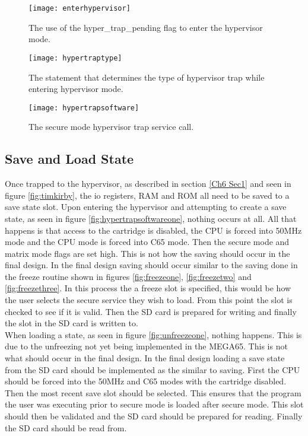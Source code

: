 \begin{figure}
  \centering
  \texttt{[image: enterhypervisor]}
  \caption{The use of the hyper\_trap\_pending flag to enter the hypervisor mode.}
  \label{fig:enterhypervisor}
\end{figure}

\begin{figure}
  \centering
  \texttt{[image: hypertraptype]}
  \caption{The statement that determines the type of hypervisor trap while entering hypervisor mode.}
  \label{fig:hypertraptype}
\end{figure}

\begin{figure}
  \centering
  \texttt{[image: hypertrapsoftware]}
  \caption{The secure mode hypervisor trap service call.}
  \label{fig:hypertrapsoftware}
\end{figure}


\subsection{Save and Load State}

\label{Ch6 Sec3 Sub2}

Once trapped to the hypervisor, as described in section \ref{Ch6 Sec1} and seen in figure \ref{fig:timkirby}, the io registers, RAM and ROM all need to be saved to a save state slot.
Upon entering the hypervisor and attempting to create a save state, as seen in figure \ref{fig:hypertrapsoftwareone}, nothing occurs at all. All that happens is that access to the cartridge is disabled, the CPU is forced into 50MHz mode and the CPU mode is forced into C65 mode. Then the secure mode and matrix mode flags are set high. This is not how the saving should occur in the final design. In the final design saving should occur similar to the saving done in the freeze routine shown in figures \ref{fig:freezeone}, \ref{fig:freezetwo} and \ref{fig:freezethree}. In this process the a freeze slot is specified, this would be how the user selects the secure service they wish to load. From this point the slot is checked to see if it is valid. Then the SD card is prepared for writing and finally the slot in the SD card is written to.\\

When loading a state, as seen in figure \ref{fig:unfreezeone}, nothing happens. This is due to the unfreezing not yet being implemented in the MEGA65. This is not what should occur in the final design. In the final design loading a save state from the SD card should be implemented as the similar to saving. First the CPU should be forced into the 50MHz and C65 modes with the cartridge disabled. Then the most recent save slot should be selected. This ensures that the program the user was executing prior to secure mode is loaded after secure mode. This slot should then be validated and the SD card should be prepared for reading. Finally the SD card should be read from.

